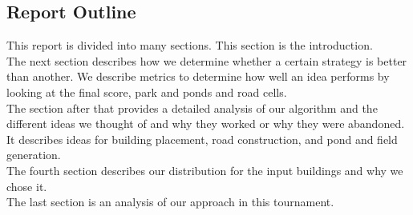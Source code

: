 \subsection{Report Outline}
This report is divided into many sections. This section is the introduction.\\ 
The next section describes how we determine whether a certain strategy is better than another. We describe metrics to determine how well an idea performs by looking at the final score, park and ponds and road cells.
\\The section after that provides a detailed analysis of our algorithm and the different ideas we thought of and why they worked or why they were abandoned. It describes ideas for building placement, road construction, and pond and field generation.
\\The fourth section describes our distribution for the input buildings and why we chose it.
\\The last section is an analysis of our approach in this tournament.
